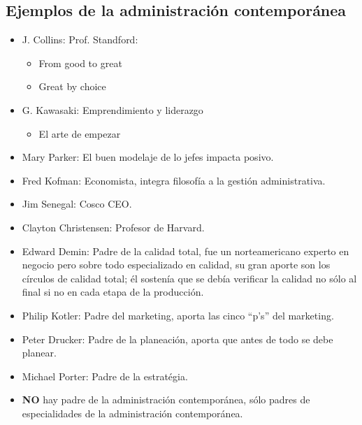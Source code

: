 \subsection{Ejemplos de la administración contemporánea}
\begin{itemize}
    \item J. Collins: Prof. Standford:
        \begin{itemize}
            \item From good to great 
            \item Great by choice 
        \end{itemize}
    
    \item G. Kawasaki: Emprendimiento y liderazgo
        \begin{itemize}
            \item El arte de empezar 
        \end{itemize}
    
    \item Mary Parker: El buen modelaje de lo jefes impacta posivo.
    \item Fred Kofman: Economista, integra filosofía a la gestión administrativa.
    \item Jim Senegal: Cosco CEO.
    \item Clayton Christensen: Profesor de Harvard.
    \item Edward Demin: Padre de la calidad total, fue un norteamericano experto en negocio pero sobre todo especializado en calidad, su gran aporte son los círculos de calidad total; él sostenía que se debía verificar la calidad no sólo al final si no en cada etapa de la producción. 
    \item Philip Kotler: Padre del marketing, aporta las cinco ``p's'' del marketing.
    \item Peter Drucker: Padre de la planeación, aporta que antes de todo se debe planear.
    \item Michael Porter: Padre de la estratégia.
\end{itemize}
\begin{itemize}[label=\#]
    \item \textbf{NO} hay padre de la administración contemporánea, sólo padres de especialidades de la administración contemporánea.
\end{itemize}
